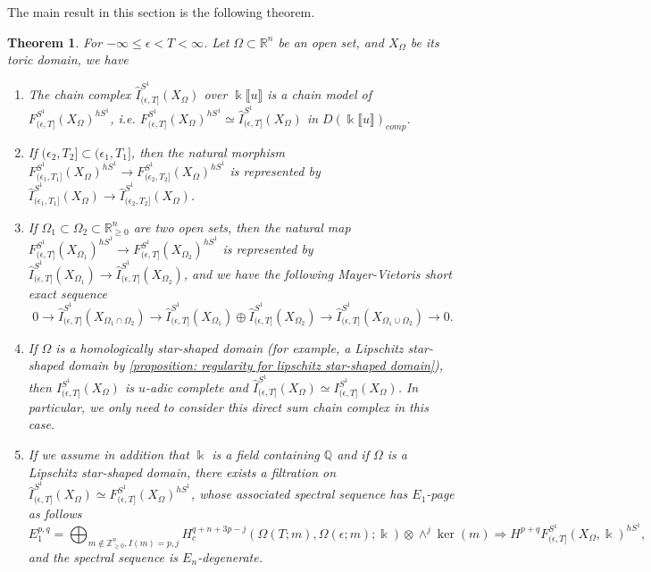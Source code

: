 \documentclass[11pt]{amsart}
\numberwithin{equation}{section}
\theoremstyle{plain}
\newtheorem{Thm}{Theorem}[section]
\theoremstyle{definition}
\theoremstyle{remark}
\newcommand{\bQ} { {\mathbb{Q}}}
\newcommand{\bZ} { {\mathbb{Z}}}
\newcommand{\bR} { {\mathbb{R}}}
\newcommand{\fpw}[1]{{\llbracket #1\rrbracket}}
\begin{document}
The main result in this section is the following theorem.
\begin{Thm}\label{thm: chain model toric domain}For $-\infty \leq \epsilon<T<\infty$. Let $\Omega\subset \bR^n$ be an open set, and $X_\Omega$ be its toric domain, we have

\begin{enumerate}[fullwidth]
\item The chain complex $\widehat{I}^{S^1}_{(\epsilon,T]}(X_\Omega)$ over $\Bbbk\fpw{u}$ is a chain model of $F_{(\epsilon,T]}^{S^1}(X_\Omega)^{hS^1}$, i.e. $F_{(\epsilon,T]}^{S^1}(X_\Omega)^{hS^1}\simeq  \widehat{I}^{S^1}_{(\epsilon,T]}(X_\Omega)$ in $D(\Bbbk\fpw{u})_{comp}$. 

\item If $(\epsilon_2,T_2]\subset (\epsilon_1,T_1]$, then the natural morphism $F_{(\epsilon_1,T_1]}^{S^1}(X_\Omega)^{hS^1}\to F_{(\epsilon_2,T_2]}^{S^1}(X_\Omega)^{hS^1}$ is represented by $\widehat{I}_{(\epsilon_1,T_1]}^{S^1}(X_\Omega)\to\widehat{I}_{(\epsilon_2,T_2]}^{S^1}(X_\Omega)$. 

\item If $\Omega_1\subset \Omega_2 \subset \bR^n_{\geq 0}$ are two open sets, then the natural map $F_{(\epsilon,T]}^{S^1}(X_{\Omega_1})^{hS^1}\to F_{(\epsilon,T]}^{S^1}(X_{\Omega_2})^{hS^1}$ is represented by $\widehat{I}^{S^1}_{(\epsilon,T]}(X_{\Omega_1})\to \widehat{I}^{S^1}_{(\epsilon,T]}(X_{\Omega_2})$, and we have the following Mayer-Vietoris short exact sequence
\[0\to \widehat{I}^{S^1}_{(\epsilon,T]}(X_{\Omega_1\cap \Omega_2})\to \widehat{I}^{S^1}_{(\epsilon,T]}(X_{\Omega_1})\oplus \widehat{I}^{S^1}_{(\epsilon,T]}(X_{\Omega_2})\to \widehat{I}^{S^1}_{(\epsilon,T]}(X_{\Omega_1\cup \Omega_2})\to 0.\]

\item If $\Omega$ is a homologically star-shaped domain (for example, a Lipschitz star-shaped domain by \autoref{proposition: regularity for lipschitz star-shaped domain}), then $I^{S^1}_{(\epsilon,T]}(X_\Omega)$ is $u$-adic complete and $\widehat{I}^{S^1}_{(\epsilon,T]}(X_\Omega)\simeq I^{S^1}_{(\epsilon,T]}(X_\Omega)$. In particular, we only need to consider this direct sum chain complex in this case.



\item  If we assume in addition that $\Bbbk$ is a field containing $\bQ$ and if $\Omega$ is a Lipschitz star-shaped domain, there exists a filtration on $\widehat{I}^{S^1}_{(\epsilon,T]}(X_\Omega)\simeq F_{(\epsilon,T]}^{S^1}(X_\Omega)^{hS^1}$, whose associated spectral sequence has $E_1$-page as follows 
\[E_1^{p,q}=\bigoplus_{m\notin \bZ^n_{\geq 0}, I(m)= p,j} H^{q+n+3p-j}_c({\Omega(T;m)},\Omega(\epsilon;m) ;\Bbbk )   \otimes \wedge^j \ker(m) \Rightarrow H^{p+q} F_{(\epsilon,T]}^{S^1}(X_\Omega,\Bbbk)^{hS^1},\]
and the spectral sequence is $E_n$-degenerate. 
\end{enumerate} 
\end{Thm}
\end{document}
